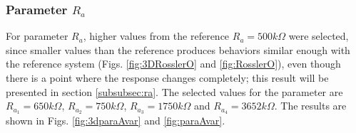     \subsubsection{Parameter \texorpdfstring{$R_a$}{Ra}}\label{subsubsec:varparaA}
    For parameter $R_a$, higher values from the reference $R_a=500k\Omega$ were selected, since smaller values than the reference produces behaviors similar enough with the reference system (Figs. \ref{fig:3DRosslerO} and \ref{fig:RosslerO}), even though there is a point where the response changes completely; this result will be presented in section \ref{subsubsec:ra}. The selected values for the parameter are $R_{a_1} = 650k\Omega$, $R_{a_2} = 750k\Omega$, $R_{a_3} = 1750k\Omega$ and $R_{a_4} = 3652k\Omega$. The results are shown in Figs. \ref{fig:3dparaAvar} and \ref{fig:paraAvar}.
    
